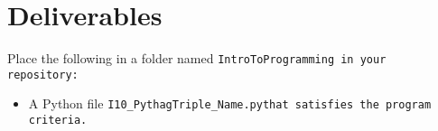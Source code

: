 \documentclass{article}
\newcommand\foldername{\tt{IntroToProgramming} }
\newcommand\filename{\tt{I10\_PythagTriple\_Name.py}\;\;}
\begin{document}
\section*{Deliverables}
	
	
	Place the following in a folder named \foldername in your repository:
	\begin{itemize}
		\item A Python file \filename  that satisfies the program criteria.
	\end{itemize}

	
\end{document}
